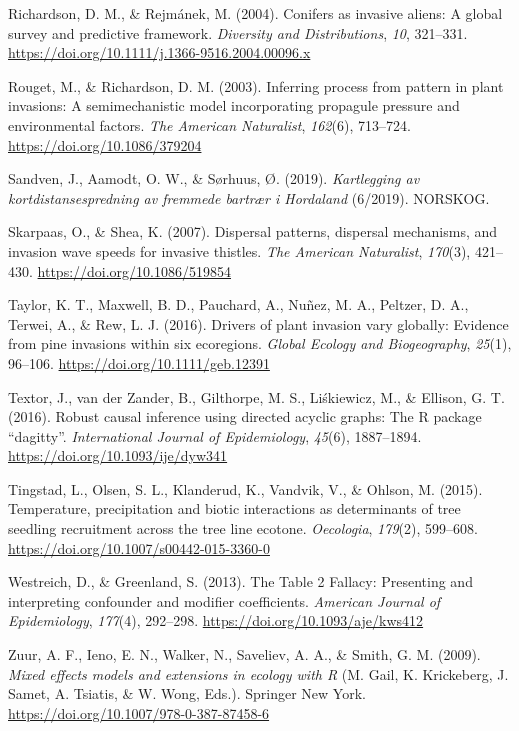 \documentclass[
]{article}
\begin{document}
\leavevmode\hypertarget{ref-richardsonConifersInvasiveAliens2004}{}%
Richardson, D. M., \& Rejmánek, M. (2004). Conifers as invasive aliens: A global survey and predictive framework. \emph{Diversity and Distributions}, \emph{10}, 321--331. \url{https://doi.org/10.1111/j.1366-9516.2004.00096.x}

\leavevmode\hypertarget{ref-rougetInferringProcessPattern2003}{}%
Rouget, M., \& Richardson, D. M. (2003). Inferring process from pattern in plant invasions: A semimechanistic model incorporating propagule pressure and environmental factors. \emph{The American Naturalist}, \emph{162}(6), 713--724. \url{https://doi.org/10.1086/379204}

\leavevmode\hypertarget{ref-sandvenKartleggingAvKortdistansespredning2019}{}%
Sandven, J., Aamodt, O. W., \& Sørhuus, Ø. (2019). \emph{Kartlegging av kortdistansespredning av fremmede bartrær i Hordaland} (6/2019). NORSKOG.

\leavevmode\hypertarget{ref-skarpaasDispersalPatternsDispersal2007}{}%
Skarpaas, O., \& Shea, K. (2007). Dispersal patterns, dispersal mechanisms, and invasion wave speeds for invasive thistles. \emph{The American Naturalist}, \emph{170}(3), 421--430. \url{https://doi.org/10.1086/519854}

\leavevmode\hypertarget{ref-taylorDriversPlantInvasion2016}{}%
Taylor, K. T., Maxwell, B. D., Pauchard, A., Nuñez, M. A., Peltzer, D. A., Terwei, A., \& Rew, L. J. (2016). Drivers of plant invasion vary globally: Evidence from pine invasions within six ecoregions. \emph{Global Ecology and Biogeography}, \emph{25}(1), 96--106. \url{https://doi.org/10.1111/geb.12391}

\leavevmode\hypertarget{ref-textorRobustCausalInference2016}{}%
Textor, J., van der Zander, B., Gilthorpe, M. S., Liśkiewicz, M., \& Ellison, G. T. (2016). Robust causal inference using directed acyclic graphs: The R package ``dagitty''. \emph{International Journal of Epidemiology}, \emph{45}(6), 1887--1894. \url{https://doi.org/10.1093/ije/dyw341}

\leavevmode\hypertarget{ref-tingstadTemperaturePrecipitationBiotic2015}{}%
Tingstad, L., Olsen, S. L., Klanderud, K., Vandvik, V., \& Ohlson, M. (2015). Temperature, precipitation and biotic interactions as determinants of tree seedling recruitment across the tree line ecotone. \emph{Oecologia}, \emph{179}(2), 599--608. \url{https://doi.org/10.1007/s00442-015-3360-0}

\leavevmode\hypertarget{ref-westreichTableFallacyPresenting2013}{}%
Westreich, D., \& Greenland, S. (2013). The Table 2 Fallacy: Presenting and interpreting confounder and modifier coefficients. \emph{American Journal of Epidemiology}, \emph{177}(4), 292--298. \url{https://doi.org/10.1093/aje/kws412}

\leavevmode\hypertarget{ref-zuurMixedEffectsModels2009}{}%
Zuur, A. F., Ieno, E. N., Walker, N., Saveliev, A. A., \& Smith, G. M. (2009). \emph{Mixed effects models and extensions in ecology with R} (M. Gail, K. Krickeberg, J. Samet, A. Tsiatis, \& W. Wong, Eds.). Springer New York. \url{https://doi.org/10.1007/978-0-387-87458-6}
\end{document}
